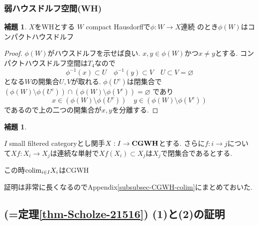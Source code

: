 \documentclass[dvipdfmx,a4paper,11pt]{article}
\newcommand{\colim}{{\rm colim}}
\theoremstyle{definition}
\newtheorem{lem}[thm]{補題}
\newcommand{\xr}[1]{\textcolor{red}{#1}}
\begin{document}
\subsubsection{弱ハウスドルフ空間(WH)}

\begin{tcolorbox}
 [colback = white, colframe = green!35!black, fonttitle = \bfseries,breakable = true]
\begin{lem}\cite[Lemma 1.3]{Str}
\label{lem-weakhaus}
$X$をWHとする 
$W$ compact Hausdorffで$\phi : W \to X$連続
のとき$\phi(W)$はコンパクトハウスドルフ
\end{lem}
\end{tcolorbox}

\begin{proof}
$\phi(W)$がハウスドルフを示せば良い.
$x,y \in \phi(W)$かつ$x \neq y$とする.
コンパクトハウスドルフ空間は$T_4$なので
$$
\phi^{-1}(x) \subset U\quad
\phi^{-1}(y) \subset V\quad
U \subset V = \varnothing
$$
となる$W$の開集合$U,V$が取れる. 
$\phi(U^{c})$は閉集合で
$\left( \phi(W) \setminus \phi(U^c) \right) \cap \left( \phi(W) \setminus \phi(V^c) \right) = \varnothing$
であり
$$
x \in \left( \phi(W) \setminus \phi(U^c) \right) \quad
y \in \left( \phi(W) \setminus \phi(V^c) \right) 
$$
であるので上の二つの開集合が$x,y$を分離する.
\end{proof}



\begin{tcolorbox}
 [colback = white, colframe = green!35!black, fonttitle = \bfseries,breakable = true]

\begin{lem}\cite[Lemma 3.3]{Str}
\label{lem-weakhaus-2}

$I$ small filtered categoryとし関手$X : I \to {\bf CGWH}$とする. 
さらに$f: i \to j$について$Xf : X_i \to X_j$は連続な単射で$Xf(X_i) \subset X_j$は$X_j$で閉集合であるとする. 

この時$\colim_{i \in I}X_i$はCGWH
\end{lem}
\end{tcolorbox}
証明は非常に長くなるのでAppendix\ref{subsubsec-CGWH-colim}にまとめておいた. 

\subsection{\cite[Proposition 2.15, Theorem 2.16]{Sch19}(=定理\ref{thm-Scholze-21516}) (1)と(2)の証明}
\end{document}
